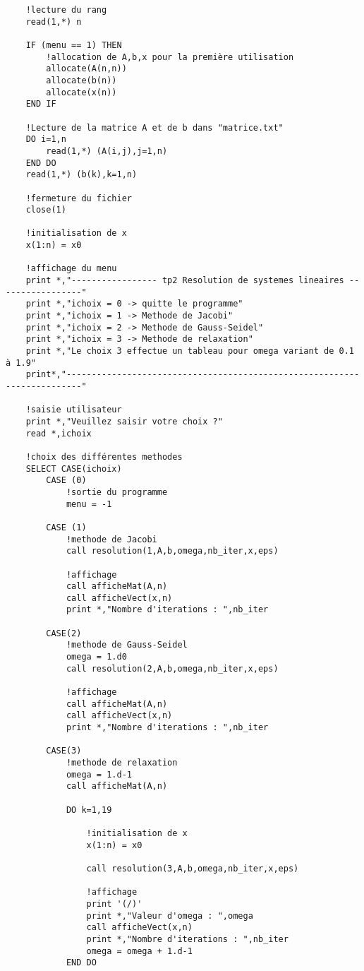 \documentclass{report}
\begin{document}
\begin{small}
\begin{verbatim}
    !lecture du rang
    read(1,*) n

    IF (menu == 1) THEN
        !allocation de A,b,x pour la première utilisation
        allocate(A(n,n))
        allocate(b(n))
        allocate(x(n))
    END IF

    !Lecture de la matrice A et de b dans "matrice.txt"
    DO i=1,n
        read(1,*) (A(i,j),j=1,n)
    END DO
    read(1,*) (b(k),k=1,n)

    !fermeture du fichier
    close(1)

    !initialisation de x
    x(1:n) = x0

    !affichage du menu
    print *,"----------------- tp2 Resolution de systemes lineaires -----------------"
    print *,"ichoix = 0 -> quitte le programme"
    print *,"ichoix = 1 -> Methode de Jacobi"
    print *,"ichoix = 2 -> Methode de Gauss-Seidel"
    print *,"ichoix = 3 -> Methode de relaxation"
    print *,"Le choix 3 effectue un tableau pour omega variant de 0.1 à 1.9"
    print*,"-------------------------------------------------------------------------"

    !saisie utilisateur
    print *,"Veuillez saisir votre choix ?"
    read *,ichoix

    !choix des différentes methodes
    SELECT CASE(ichoix)
        CASE (0)
            !sortie du programme
            menu = -1

        CASE (1)
            !methode de Jacobi
            call resolution(1,A,b,omega,nb_iter,x,eps)

            !affichage
            call afficheMat(A,n)
            call afficheVect(x,n)
            print *,"Nombre d'iterations : ",nb_iter

        CASE(2)
            !methode de Gauss-Seidel
            omega = 1.d0
            call resolution(2,A,b,omega,nb_iter,x,eps)

            !affichage
            call afficheMat(A,n)
            call afficheVect(x,n)
            print *,"Nombre d'iterations : ",nb_iter

        CASE(3)
            !methode de relaxation
            omega = 1.d-1
            call afficheMat(A,n)

            DO k=1,19

                !initialisation de x
                x(1:n) = x0

                call resolution(3,A,b,omega,nb_iter,x,eps)

                !affichage
                print '(/)'
                print *,"Valeur d'omega : ",omega
                call afficheVect(x,n)
                print *,"Nombre d'iterations : ",nb_iter
                omega = omega + 1.d-1
            END DO


\end{verbatim}
\end{small}
\end{document}
